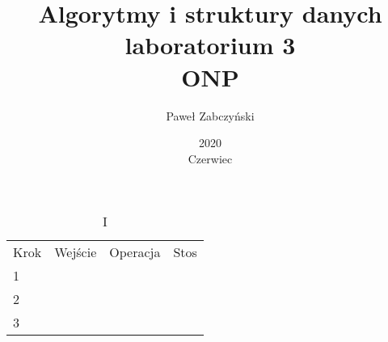\documentclass{article}
\title{Algorytmy i struktury danych laboratorium 3\\ONP}
\author{Paweł Zabczyński}
\date{2020\\ Czerwiec}
\begin{document}
\maketitle

\begin{table}[]
\caption{I}
\begin{tabular}{llll}
Krok & Wejście & Operacja & Stos \\
    1 &         &          &      \\
    2 &         &          &      \\
    3 &         &          &
\end{tabular}
\end{table}
\end{document}
